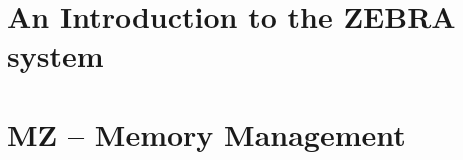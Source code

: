\renewcommand{\vpageref}[1]{\ref{#1}}
\renewcommand{\vref}[1]{\ref{#1}}
\renewcommand{\fullref}[1]{\ref{#1}}
\newcommand{\FZfile}{FZ~file}
\newcommand{\RZfile}{RZ~file}
\newcommand{\IQUEST}{IQUEST}
\newcommand{\QUEST}{QUEST}
\renewcommand{\CERNLIB}{\textsc{cernlib}\index{CERNLIB}}
\renewcommand{\CMZ}{\textsc{cmz}\index{CMZ}}
\renewcommand{\COMIS}{\textsc{comis}\index{COMIS}}
\renewcommand{\CSPACK}{\textsc{cspack}\index{CSPACK}}
\renewcommand{\FATMEN}{\textsc{fatmen}\index{FATMEN}}
\renewcommand{\GEANT}{\textsc{geant}\index{GEANT}}
\renewcommand{\GKS}{\textsc{gks}\index{GKS}}
\renewcommand{\HBOOK}{\textsc{hbook}\index{HBOOK}}
\renewcommand{\HEPDB}{\textsc{hepdb}\index{HEPDB}}
\renewcommand{\HIGZ}{\textsc{higz}\index{HIGZ}}
\renewcommand{\HPLOT}{\textsc{hplot}\index{HPLOT}}
\renewcommand{\KUIP}{\textsc{kuip}\index{KUIP}}
\renewcommand{\MINUIT}{\textsc{minuit}\index{MINUIT}}
\renewcommand{\PATCHY}{\textsc{patchy}\index{PATCHY}}
\renewcommand{\PAW}{\textsc{paw}\index{PAW}}
\renewcommand{\SIGMA}{\textsc{sigma}\index{SIGMA}}
\renewcommand{\PAWPP}{\textsc{paw++}\index{PAW++}}
\renewcommand{\WWW}{\textsc{www}\index{WWW}}
\renewcommand{\VAXTAP}{\textsc{vaxtap}\index{VAXTAP}}
\renewcommand{\ZEBRA}{\textsc{zebra}\index{ZEBRA}}

\makeindex
\newenvironment{landscapebody}{}{}
%



\part{An Introduction to the ZEBRA system}



\part{MZ -- Memory Management}









